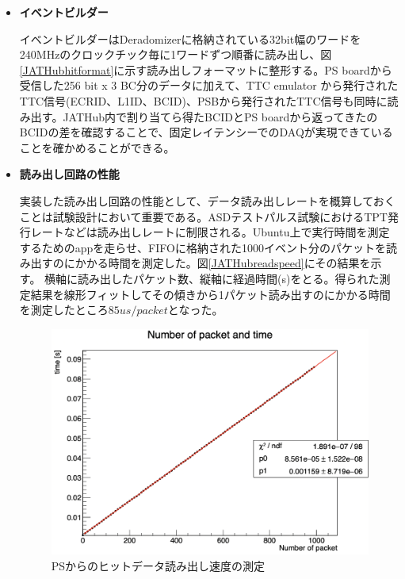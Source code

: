 \begin{itemize}
    \item \textbf{イベントビルダー} \par
    イベントビルダーはDeradomizerに格納されている32bit幅のワードを240MHzのクロックチック毎に1ワードずつ順番に読み出し、図\ref{JATHubhitformat}に示す読み出しフォーマットに整形する。PS boardから受信した256 bit x 3 BC分のデータに加えて、TTC emulator から発行されたTTC信号(ECRID、L1ID、BCID)、PSBから発行されたTTC信号も同時に読み出す。JATHub内で割り当てら得たBCIDとPS boardから返ってきたのBCIDの差を確認することで、固定レイテンシーでのDAQが実現できていることを確かめることができる。
    \baselineskip

    \item \textbf{読み出し回路の性能} \par
    実装した読み出し回路の性能として、データ読み出しレートを概算しておくことは試験設計において重要である。ASDテストパルス試験におけるTPT発行レートなどは読み出しレートに制限される。Ubuntu上で実行時間を測定するためのappを走らせ、FIFOに格納された1000イベント分のパケットを読み出すのにかかる時間を測定した。図\ref{JATHubreadspeed}にその結果を示す。
    横軸に読み出したパケット数、縦軸に経過時間(s)をとる。得られた測定結果を線形フィットしてその傾きから1パケット読み出すのにかかる時間を測定したところ$85 us/packet$となった。

    \baselineskip
    \begin{figure} 
    \centering
    \includegraphics[width=16cm]{fig/JTAHubreadspeed.png}
    \caption[PSからのヒットデータ読み出し速度の測定]{PSからのヒットデータ読み出し速度の測定}
    \label{JTAHubreadspeed}
    \end{figure}


\end{itemize}
